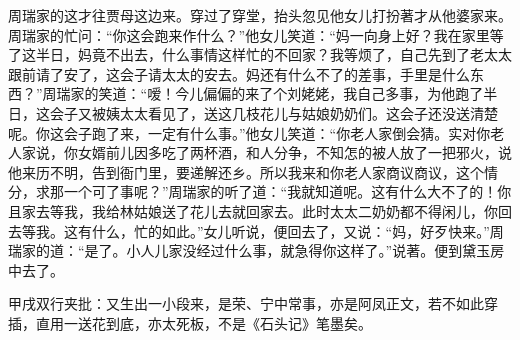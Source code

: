 \begin{parag}


    周瑞家的这才往贾母这边来。穿过了穿堂，抬头忽见他女儿打扮著才从他婆家来。周瑞家的忙问：“你这会跑来作什么？”他女儿笑道：“妈一向身上好？我在家里等了这半日，妈竟不出去，什么事情这样忙的不回家？我等烦了，自己先到了老太太跟前请了安了，这会子请太太的安去。妈还有什么不了的差事，手里是什么东西？”周瑞家的笑道：“嗳！今儿偏偏的来了个刘姥姥，我自己多事，为他跑了半日，这会子又被姨太太看见了，送这几枝花儿与姑娘奶奶们。这会子还没送清楚呢。你这会子跑了来，一定有什么事。”他女儿笑道：“你老人家倒会猜。实对你老人家说，你女婿前儿因多吃了两杯酒，和人分争，不知怎的被人放了一把邪火，说他来历不明，告到衙门里，要递解还乡。所以我来和你老人家商议商议，这个情分，求那一个可了事呢？”周瑞家的听了道：“我就知道呢。这有什么大不了的！你且家去等我，我给林姑娘送了花儿去就回家去。此时太太二奶奶都不得闲儿，你回去等我。这有什么，忙的如此。”女儿听说，便回去了，又说：“妈，好歹快来。”周瑞家的道：“是了。小人儿家没经过什么事，就急得你这样了。”说著。便到黛玉房中去了。\begin{note}甲戌双行夹批：又生出一小段来，是荣、宁中常事，亦是阿凤正文，若不如此穿插，直用一送花到底，亦太死板，不是《石头记》笔墨矣。\end{note}
\end{parag}


